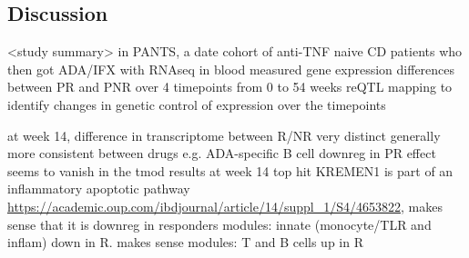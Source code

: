 \begin{outline}
\section{Discussion}

\1 <study summary>
    \2 in PANTS, a date cohort of anti-TNF naive CD patients who then got ADA/IFX with RNAseq in blood
    \2 measured gene expression differences between PR and PNR over 4 timepoints from 0 to 54 weeks
    \2 reQTL mapping to identify changes in genetic control of expression over the timepoints

\1 at week 14, difference in transcriptome between R/NR very distinct
    \2 generally more consistent between drugs
        \3 e.g. ADA-specific B cell downreg in PR effect seems to vanish in the tmod results at week 14
    \2 top hit KREMEN1 is part of an inflammatory apoptotic pathway \url{https://academic.oup.com/ibdjournal/article/14/suppl_1/S4/4653822}, makes sense that it is downreg in responders
    \2 modules: innate (monocyte/TLR and inflam) down in R. makes sense
    \2 modules: T and B cells up in R 


\end{outline}
